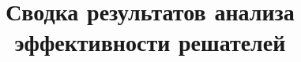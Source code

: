 \documentclass[%
	11pt,
	a4paper,
	utf8,
		]{article}
\begin{document}
\title{Сводка результатов анализа эффективности решателей}


\date{}
\maketitle

\thispagestyle{fancy}




\newcommand\ccr[1]{\cellcolor{red!20}{#1}}
\newcommand\ccb[1]{\cellcolor{blue!20}{#1}}

\def\nVarsA{106674}
\def\nBinVarsA{0}
\def\nIntVarsA{3069}
\def\nConssA{106029}

\def\firstSolHighsObjA{1.2296637}  %
\def\firstSolHighsTimeA{47.6}
\def\firstSolZyoptObjA{1.2313417}  %
\def\firstSolZyoptTimeA{7.1}

\newcommand{\cplexObjA}{1.2286400825}  %
\newcommand{\zyoptObjA}{1.2285012}  %
\newcommand{\highsObjA}{1.2296637}  %
\newcommand{\cplexZyoptObjRelA}{(\fpeval{\cplexObjA} - \fpeval{\zyoptObjA}) / \fpeval{\cplexObjA} * 100}
\newcommand{\cplexHighsObjRelA}{(\fpeval{\cplexObjA} - \fpeval{\highsObjA}) / \fpeval{\cplexObjA} * 100}
\end{document}
